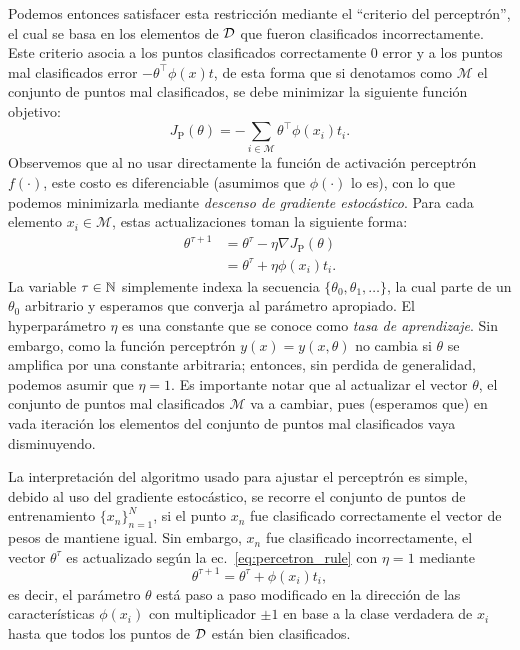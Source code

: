 Podemos entonces satisfacer esta restricción mediante el ``criterio del perceptrón'', el cual se basa en los elementos de ${\mathcal D}$ que fueron clasificados incorrectamente. Este criterio asocia a los puntos clasificados correctamente 0 error y a los puntos mal clasificados error $-\theta^\top\phi(x)t$, de esta forma que si denotamos como $\mathcal{M}$ el conjunto de puntos mal clasificados, se debe minimizar la siguiente función objetivo:
\begin{equation}
	J_\text{P}(\theta) = -\sum_{i\in\mathcal{M}}\theta^\top\phi(x_i)t_i. 
\end{equation}
Observemos que al no usar directamente la función de activación perceptrón $f(\cdot)$, este costo es diferenciable (asumimos que $\phi(\cdot)$ lo es), con lo que podemos  minimizarla mediante \emph{descenso de gradiente estocástico}. Para cada elemento $x_i\in\mathcal{M}$, estas actualizaciones toman la siguiente forma:
\begin{align}
	\theta^{\tau+1} &= \theta^\tau - \eta \nabla J_\text{P}(\theta)\\
	&= \theta^\tau + \eta \phi(x_i)t_i.\label{eq:percetron_rule}
\end{align}
La variable $\tau\in{\mathbb N}$ simplemente indexa la secuencia $\{\theta_0,\theta_1,\ldots\}$, la cual  parte de un $\theta_0$ arbitrario y esperamos que converja al parámetro apropiado. El hyperparámetro $\eta$ es una constante que se conoce como \emph{tasa de aprendizaje}. Sin embargo, como la función perceptrón $y(x)=y(x,\theta)$ no cambia si $\theta$ se amplifica por una constante arbitraria; entonces, sin perdida de generalidad, podemos asumir que $\eta=1$. Es importante notar que al actualizar el vector $\theta$, el conjunto de puntos mal clasificados $\mathcal{M}$ va a cambiar, pues (esperamos que) en vada iteración los elementos del conjunto de puntos mal clasificados vaya disminuyendo.

La interpretación del algoritmo usado para ajustar el perceptrón es simple, debido al uso del gradiente estocástico, se recorre el conjunto de puntos de entrenamiento $\{x_n\}_{n=1}^N$, si el punto $x_n$ fue clasificado correctamente el vector de pesos de mantiene igual. Sin embargo, $x_n$ fue clasificado incorrectamente, el vector $\theta^\tau$ es actualizado según la ec.~\eqref{eq:percetron_rule} con $\eta=1$ mediante
\begin{equation}
	 \theta^{\tau+1} = \theta^\tau + \phi(x_i)t_i,
\end{equation}
es decir, el parámetro $\theta$ está paso a paso modificado en la dirección de las características $\phi(x_i)$ con multiplicador $\pm1$ en base a la clase verdadera de $x_i$ hasta  que todos los puntos de ${\mathcal D}$ están bien clasificados. 

